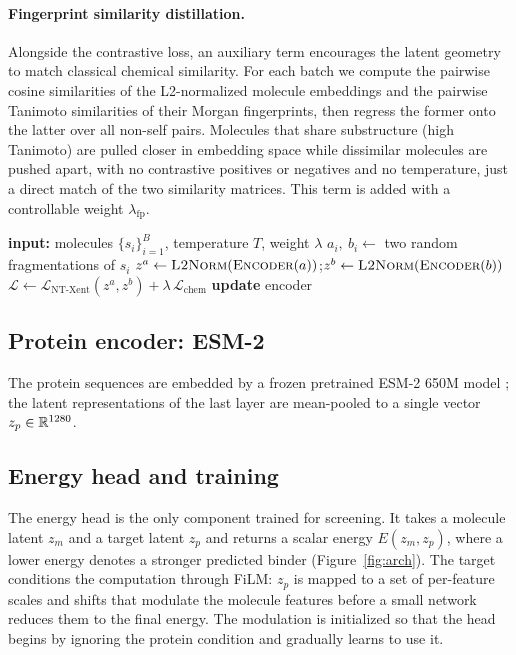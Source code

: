 \documentclass[10pt]{article}
\newcommand{\proteinEncoder}{ESM-2 650M}
\begin{document}
\paragraph{Fingerprint similarity distillation.}
Alongside the contrastive loss, an auxiliary term encourages the latent geometry
to match classical chemical similarity. For each batch we compute the pairwise
cosine similarities of the L2-normalized molecule embeddings and the pairwise
Tanimoto similarities of their Morgan fingerprints, then regress the former onto
the latter over all non-self pairs. Molecules that share substructure (high
Tanimoto) are pulled closer in embedding space while dissimilar molecules are
pushed apart, with no contrastive positives or negatives and no temperature, just
a direct match of the two similarity matrices. This term is added with a controllable
weight $\lambda_{\text{fp}}$.
\begin{algorithm}[t]
\caption{Contrastive pretraining step (one minibatch of $B$ molecules)}
\label{alg:ntxent}
\begin{algorithmic}[1]
\State \textbf{input:} molecules $\{s_i\}_{i=1}^{B}$, temperature $T$, weight $\lambda$
  \State $a_i,\ b_i \gets$ two random fragmentations of $s_i$ 
\EndFor
\State $z^a \gets \textsc{L2Norm}(\textsc{Encoder}(a))$;\quad $z^b \gets \textsc{L2Norm}(\textsc{Encoder}(b))$
\State $\mathcal{L} \gets \mathcal{L}_{\text{NT-Xent}}(z^a, z^b) + \lambda\,\mathcal{L}_{\text{chem}}$ 
\State \textbf{update} encoder
\end{algorithmic}
\end{algorithm}

\subsection{Protein encoder: ESM-2}\label{sec:protenc}
The protein sequences are embedded by a frozen pretrained \proteinEncoder{} model
\citep{lin2023esm2}; the latent representations of the last layer are mean-pooled to a single vector
$z_p\in\mathbb{R}^{1280}$.

\subsection{Energy head and training}\label{sec:ebm}
The energy head is the only component trained for screening. It takes a molecule
latent $z_m$ and a target latent $z_p$ and returns a scalar energy $E(z_m, z_p)$,
where a lower energy denotes a stronger predicted binder (Figure~\ref{fig:arch}).
The target conditions the computation through FiLM: $z_p$ is mapped to a set of
per-feature scales and shifts that modulate the molecule features before a small
network reduces them to the final energy. The modulation is initialized so that
the head begins by ignoring the protein condition and gradually learns to use it.
\end{document}
